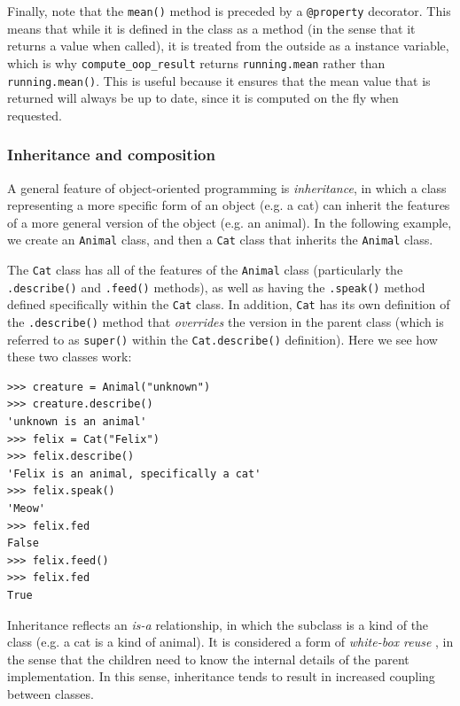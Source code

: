 Finally, note that the \texttt{mean()} method is preceded by a \texttt{@property} decorator.  This means that while it is defined in the class as a method (in the sense that it returns a value when called), it is treated from the outside as a instance variable, which is why \texttt{compute\_oop\_result} returns \texttt{running.mean} rather than \texttt{running.mean()}.  This is useful because it ensures that the mean value that is returned will always be up to date, since it is computed on the fly when requested.

\subsubsection{Inheritance and composition}

A general feature of object-oriented programming is \textit{inheritance}, in which a class representing a more specific form of an object (e.g. a cat) can inherit the features of a more general version of the object (e.g. an animal). In the following example, we create an \texttt{Animal} class, and then a \texttt{Cat} class that inherits the \texttt{Animal} class.



The \texttt{Cat} class has all of the features of the \texttt{Animal} class (particularly the \texttt{.describe()} and \texttt{.feed()} methods), as well as having the \texttt{.speak()} method defined specifically within the \texttt{Cat} class. In addition, \texttt{Cat} has its own definition of the \texttt{.describe()} method that \textit{overrides} the version in the parent class (which is referred to as \texttt{super()} within the \texttt{Cat.describe()} definition). Here we see how these two classes work:

\begin{lstlisting}[style=repl]
>>> creature = Animal("unknown")
>>> creature.describe()
'unknown is an animal'
>>> felix = Cat("Felix")
>>> felix.describe()
'Felix is an animal, specifically a cat'
>>> felix.speak()
'Meow'
>>> felix.fed
False
>>> felix.feed()
>>> felix.fed
True
\end{lstlisting}

Inheritance reflects an \textit{is-a} relationship, in which the subclass is a kind of the class (e.g. a cat is a kind of animal). It is considered a form of \textit{white-box reuse} \citep{Gamma:1995aa}, in the sense that the children need to know the internal details of the parent implementation.  In this sense, inheritance tends to result in increased coupling between classes.

